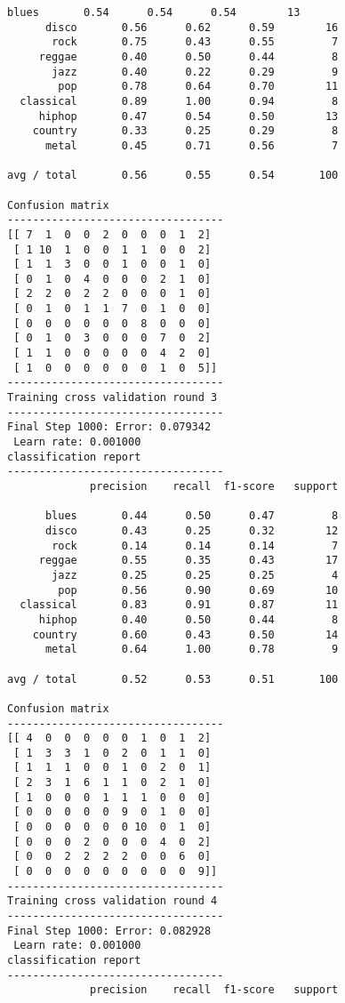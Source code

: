 \documentclass{article}
\begin{document}
\begin{Verbatim}[commandchars=\\\{\}]
      blues       0.54      0.54      0.54        13
      disco       0.56      0.62      0.59        16
       rock       0.75      0.43      0.55         7
     reggae       0.40      0.50      0.44         8
       jazz       0.40      0.22      0.29         9
        pop       0.78      0.64      0.70        11
  classical       0.89      1.00      0.94         8
     hiphop       0.47      0.54      0.50        13
    country       0.33      0.25      0.29         8
      metal       0.45      0.71      0.56         7

avg / total       0.56      0.55      0.54       100

Confusion matrix
----------------------------------
[[ 7  1  0  0  2  0  0  0  1  2]
 [ 1 10  1  0  0  1  1  0  0  2]
 [ 1  1  3  0  0  1  0  0  1  0]
 [ 0  1  0  4  0  0  0  2  1  0]
 [ 2  2  0  2  2  0  0  0  1  0]
 [ 0  1  0  1  1  7  0  1  0  0]
 [ 0  0  0  0  0  0  8  0  0  0]
 [ 0  1  0  3  0  0  0  7  0  2]
 [ 1  1  0  0  0  0  0  4  2  0]
 [ 1  0  0  0  0  0  0  1  0  5]]
----------------------------------
Training cross validation round 3
----------------------------------
Final Step 1000: Error: 0.079342 
 Learn rate: 0.001000
classification report 
----------------------------------
             precision    recall  f1-score   support

      blues       0.44      0.50      0.47         8
      disco       0.43      0.25      0.32        12
       rock       0.14      0.14      0.14         7
     reggae       0.55      0.35      0.43        17
       jazz       0.25      0.25      0.25         4
        pop       0.56      0.90      0.69        10
  classical       0.83      0.91      0.87        11
     hiphop       0.40      0.50      0.44         8
    country       0.60      0.43      0.50        14
      metal       0.64      1.00      0.78         9

avg / total       0.52      0.53      0.51       100

Confusion matrix
----------------------------------
[[ 4  0  0  0  0  0  1  0  1  2]
 [ 1  3  3  1  0  2  0  1  1  0]
 [ 1  1  1  0  0  1  0  2  0  1]
 [ 2  3  1  6  1  1  0  2  1  0]
 [ 1  0  0  0  1  1  1  0  0  0]
 [ 0  0  0  0  0  9  0  1  0  0]
 [ 0  0  0  0  0  0 10  0  1  0]
 [ 0  0  0  2  0  0  0  4  0  2]
 [ 0  0  2  2  2  2  0  0  6  0]
 [ 0  0  0  0  0  0  0  0  0  9]]
----------------------------------
Training cross validation round 4
----------------------------------
Final Step 1000: Error: 0.082928 
 Learn rate: 0.001000
classification report 
----------------------------------
             precision    recall  f1-score   support


\end{Verbatim}
\end{document}

